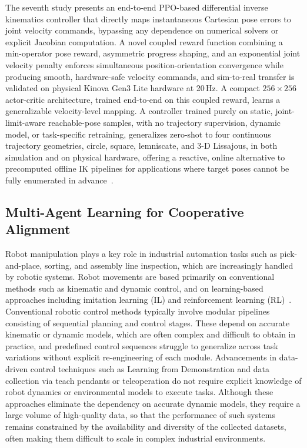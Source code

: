 The seventh study presents an end-to-end PPO-based differential inverse kinematics controller that
directly maps instantaneous Cartesian pose errors to joint velocity commands, bypassing any dependence on numerical solvers or explicit Jacobian
computation. A novel coupled reward function combining a min-operator pose reward, asymmetric
progress shaping, and an exponential joint velocity penalty enforces simultaneous position-orientation
convergence while producing smooth, hardware-safe velocity commands, and sim-to-real transfer is
validated on physical Kinova Gen3 Lite hardware at 20\,Hz. A compact $256\times256$ actor-critic
architecture, trained end-to-end on this coupled reward, learns a generalizable velocity-level
mapping. A controller trained purely on static, joint-limit-aware reachable-pose samples, with no
trajectory supervision, dynamic model, or task-specific retraining, generalizes zero-shot to four
continuous trajectory geometries, circle, square, lemniscate, and 3-D Lissajous, in both
simulation and on physical hardware, offering a reactive, online alternative to precomputed offline
IK pipelines for applications where target poses cannot be fully enumerated in
advance~\citep{sk2025diktracking}.

\subsection{Multi-Agent Learning for Cooperative Alignment}\label{subsec:intro_alpha}

Robot manipulation plays a key role in industrial automation tasks such as pick-and-place, sorting,
and assembly line inspection, which are increasingly handled by robotic systems. Robot movements are
based primarily on conventional methods such as kinematic and dynamic control, and on learning-based
approaches including imitation learning (IL) and reinforcement learning
(RL)~\citep{zare2024survey}. Conventional robotic control methods typically involve
modular pipelines consisting of sequential planning and control stages. These depend on accurate
kinematic or dynamic models, which are often complex and difficult to obtain in practice, and
predefined control sequences struggle to generalize across task variations without explicit
re-engineering of each module. Advancements in data-driven control techniques such as Learning from
Demonstration and data collection via teach pendants or teleoperation do not require explicit
knowledge of robot dynamics or environmental models to execute tasks. Although these approaches
eliminate the dependency on accurate dynamic models, they require a large volume of high-quality
data, so that the performance of such systems remains constrained by the availability and diversity
of the collected datasets, often making them difficult to scale in complex industrial
environments.


